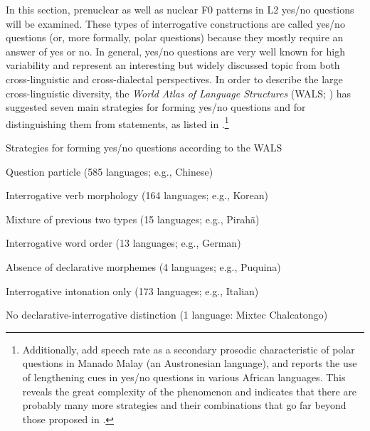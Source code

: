 In this section, prenuclear as well as nuclear F0 patterns in L2 yes/no questions will be examined. These types of interrogative constructions are called yes/no questions (or, more formally, polar questions) because they mostly require an answer of yes or no. In general, yes/no questions are very well known for high variability and represent an interesting but widely discussed topic from both cross-linguistic and cross-dialectal perspectives. In order to describe the large cross-linguistic diversity, the \textit{World Atlas of Language Structures} (WALS; \citealt{Dryer2013}) has suggested seven main strategies for forming yes/no questions and for distinguishing them from statements, as listed in .\footnote{Additionally, \citet{vanHeuvenvanZanten2005} add speech rate as a secondary prosodic characteristic of polar questions in Manado Malay (an Austronesian language), and \citet{Rialland2007, Rialland2009} reports the use of lengthening cues in yes/no questions in various African languages. This reveals the great complexity of the phenomenon and indicates that there are probably many more strategies and their combinations that go far beyond those proposed in .}


\ea\label{ex:4:7}   Strategies for forming yes/no questions according to the WALS



\ea Question particle (585 languages; e.g., Chinese)



\ex Interrogative verb morphology (164 languages; e.g., Korean)



\ex Mixture of previous two types (15 languages; e.g., Pirahã)



\ex Interrogative word order (13 languages; e.g., German)



\ex Absence of declarative morphemes (4 languages; e.g., Puquina)



\ex Interrogative intonation only (173 languages; e.g., Italian)



\ex No declarative-interrogative distinction (1 language: Mixtec Chalcatongo)
\z
\z

